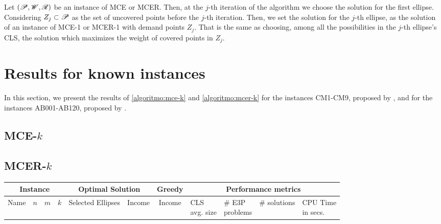 Let $(\mathscr{P}, \mathscr{W}, \mathscr{R})$ be an instance of MCE or MCER. Then, at the $j$-th iteration of the algorithm we choose the solution for the first ellipse. Considering $Z_j \subset \mathscr{P}$ as the set of uncovered points before the $j$-th iteration. Then, we set the solution for the $j$-th ellipse, as the solution of an instance of MCE-1 or MCER-1 with demand points $Z_j$.
That is the same as choosing, among all the possibilities in the $j$-th ellipse's CLS, the solution which maximizes the weight of covered points in $Z_j$.

\section{Results for known instances}

In this section, we present the results of \autoref{algoritmo:mce-k} and \autoref{algoritmo:mcer-k} for the instances CM1-CM9, proposed by , and for the instances AB001-AB120, proposed by .

\subsection{MCE-$k$}

\subsection{MCER-$k$}

\begin{table}[H]\label{tab:mcer-results}
	\begin{center}
		\begin{tabular}[\textwidth]{|c c c c|m{4em} c|c|m{4em} m{4em} m{3em} m{5em}|}
			\hline
			\multicolumn{4}{|c|}{Instance} & \multicolumn{2}{c|}{Optimal Solution} & Greedy & \multicolumn{4}{c|}{Performance metrics}\\
			\hline
			Name & $n$ & $m$ & $k$ & 
			Selected Ellipses & Income & Income 
			& \parbox{4em}{\centering CLS\\avg. size }
			& \parbox{4em}{\centering\# E3P\\ problems} 
			& \# solutions 
			& \parbox{5em}{\centering CPU Time\\ in secs.}\\
			\hline
		\end{tabular}
	\end{center}
\end{table}